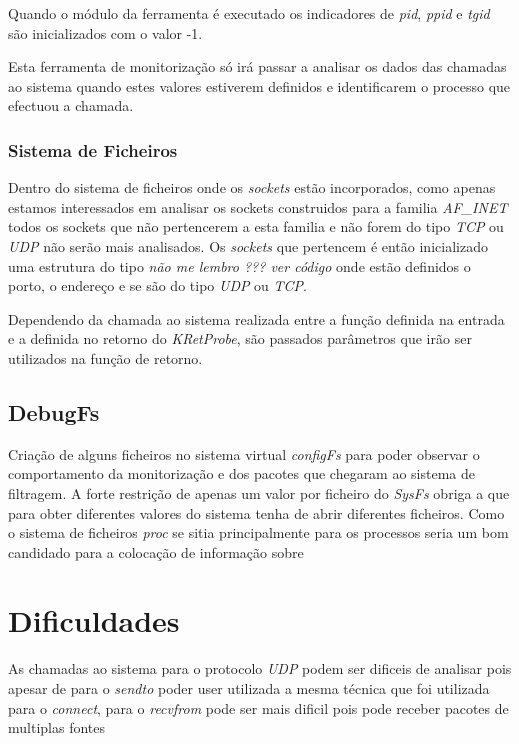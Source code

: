 Quando o módulo da ferramenta é executado os indicadores de \textit{pid}, \textit{ppid} e \textit{tgid} são inicializados com o valor -1.

Esta ferramenta de monitorização só irá passar a analisar os dados das chamadas ao sistema quando estes valores estiverem definidos e identificarem o processo que efectuou a chamada.

\subsubsection{Sistema de Ficheiros}

Dentro do sistema de ficheiros onde os \textit{sockets} estão incorporados, como apenas estamos interessados em analisar os sockets construidos para a
familia \textit{AF\_INET} todos os sockets que não pertencerem a esta familia e não forem do tipo \textit{TCP} ou \textit{UDP} não serão mais analisados.
 Os \textit{sockets} que pertencem é então inicializado uma estrutura do tipo \textit{não me lembro ??? ver código} onde estão definidos o porto, o endereço
e se são do tipo \textit{UDP} ou \textit{TCP}.

Dependendo da chamada ao sistema realizada entre a função definida na entrada e a definida no retorno do \textit{KRetProbe}, são passados parâmetros que irão
ser utilizados na função de retorno.


\subsection{DebugFs}
Criação de alguns ficheiros no sistema virtual \textit{configFs} para poder observar o comportamento da monitorização e dos pacotes que chegaram ao sistema de filtragem.
A forte restrição de apenas um valor por ficheiro do \textit{SysFs} obriga a que para obter diferentes valores do sistema tenha de abrir diferentes ficheiros.
 Como o sistema de ficheiros \textit{proc} se sitia principalmente para os processos seria um bom candidado para a colocação de informação sobre 


\section{Dificuldades}
 As chamadas ao sistema para o protocolo \textit{UDP} podem ser dificeis de analisar pois apesar de para o \textit{sendto} poder user utilizada a mesma técnica que foi utilizada para o \textit{connect}, para o \textit{recvfrom} pode ser mais dificil pois pode receber pacotes de multiplas fontes
